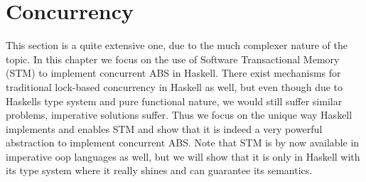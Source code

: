 \section{Concurrency}
This section is a quite extensive one, due to the much complexer nature of the topic. In this chapter we focus on the use of Software Transactional Memory (STM) to implement concurrent ABS in Haskell. There exist mechanisms for traditional lock-based concurrency in Haskell as well, but even though due to Haskells type system and pure functional nature, we would still suffer similar problems, imperative solutions suffer. Thus we focus on the unique way Haskell implements and enables STM and show that it is indeed a very powerful abstraction to implement concurrent ABS. Note that STM is by now available in imperative oop languages as well, but we will show that it is only in Haskell with its type system where it really shines and can guarantee its semantics.
